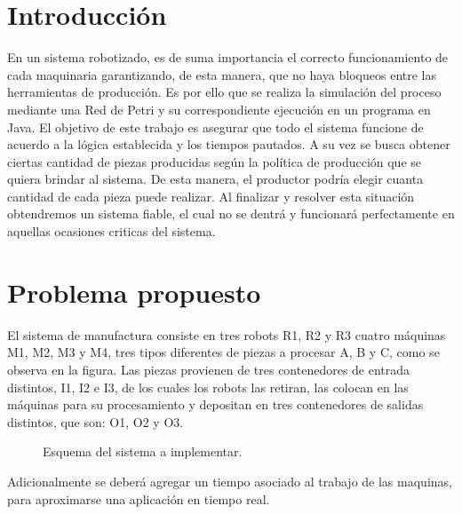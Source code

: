 \documentclass[10pt, a4paper,notitlepage]{article}
\begin{document}
\section{Introducción}
En un sistema robotizado, es de suma importancia el correcto funcionamiento de cada maquinaria garantizando, de esta manera, que no haya bloqueos entre las herramientas de producción.
Es por ello que se realiza la simulación del proceso mediante una Red de Petri y su correspondiente ejecución en un programa en Java.
El objetivo de este trabajo es asegurar que todo el sistema funcione de acuerdo a la lógica establecida y los tiempos pautados.
A su vez se busca obtener ciertas cantidad de piezas producidas según la política de producción que se quiera brindar al sistema. De esta manera, el productor podría elegir cuanta cantidad de cada pieza puede realizar.
Al finalizar y resolver esta situación obtendremos un sistema fiable, el cual no se dentrá y funcionará perfectamente en aquellas ocasiones criticas del sistema.

\section{Problema propuesto}
El sistema de manufactura consiste en tres robots R1, R2 y R3 cuatro máquinas M1, M2, M3 y M4, tres tipos diferentes de piezas a procesar A, B y C, como se observa en la figura.
Las piezas provienen de tres contenedores de entrada distintos, I1, I2 e I3, de los cuales los robots las retiran, las colocan en las máquinas para su procesamiento y depositan en tres contenedores de salidas distintos, que son: O1, O2 y O3.

\begin{figure}[H] %
	\caption{Esquema del sistema a implementar.}
	\label{fig:I1}
\end{figure}

Adicionalmente se deberá agregar un tiempo asociado al trabajo de las maquinas, para aproximarse una aplicación en tiempo real.
\end{document}

